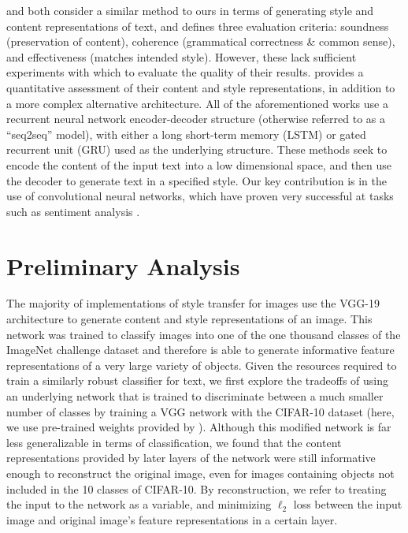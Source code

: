 \documentclass{vldb}
\begin{document}
\cite{Edirisooriya} and \cite{Kabbara16} both consider a similar method to ours in terms of generating style and content representations of text, and \cite{Kabbara16} defines three evaluation criteria: soundness (preservation of content), coherence (grammatical correctness \& common sense), and effectiveness (matches intended style). However, these lack sufficient experiments with which to evaluate the quality of their results. \cite{Fu17} provides a quantitative assessment of their content and style representations, in addition to a more complex alternative architecture. All of the aforementioned works use a recurrent neural network encoder-decoder structure (otherwise referred to as a ``seq2seq'' model), with either a long short-term memory (LSTM) or gated recurrent unit (GRU) used as the underlying structure. These methods seek to encode the content of the input text into a low dimensional space, and then use the decoder to generate text in a specified style. Our key contribution is in the use of convolutional neural networks, which have proven very successful at tasks such as sentiment analysis \cite{Kim14f}.

\section{Preliminary Analysis}
The majority of implementations of style transfer for images use the VGG-19 \cite{VGG19} architecture to generate content and style representations of an image. This network was trained to classify images into one of the one thousand classes of the ImageNet challenge dataset \cite{ILSVRC15} and therefore is able to generate informative feature representations of a very large variety of objects. Given the resources required to train a similarly robust classifier for text, we first explore the tradeoffs of using an underlying network that is trained to discriminate between a much smaller number of classes by training a VGG network with the CIFAR-10 dataset \cite{Krizhevsky09} (here, we use pre-trained weights provided by \cite{Liu15}). Although this modified network is far less generalizable in terms of classification, we found that the content representations provided by later layers of the network were still informative enough to reconstruct the original image, even for images containing objects not included in the 10 classes of CIFAR-10. By reconstruction, we refer to treating the input to the network as a variable, and minimizing $\ell_2$ loss between the input image and original image's feature representations in a certain layer.
\end{document}
